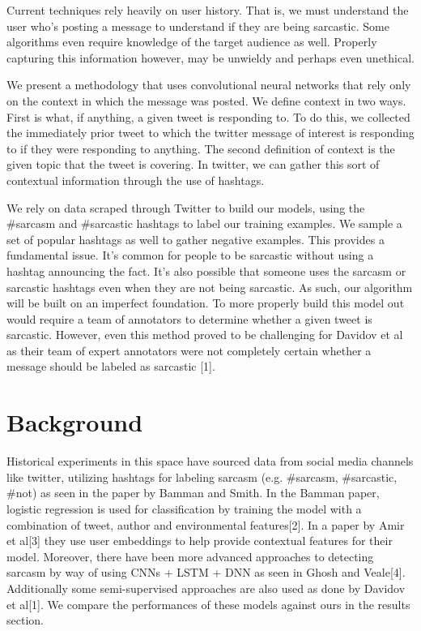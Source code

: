 \documentclass[11pt,a4paper]{article}
\begin{document}
Current techniques rely heavily on user history. That is, we must understand the user who's posting a message to understand if they are
being sarcastic. Some algorithms even require knowledge of the target audience as well. Properly capturing this information however, may be unwieldy and perhaps even unethical. 

We present a methodology that uses convolutional neural networks that rely only on the context in which the message was posted. We define context in two ways. First is what, if anything, a given tweet is responding to. To do this, we collected the immediately prior tweet to which the twitter message of interest is responding to if they were responding to anything. The second definition of context is the given topic that the tweet is covering. In twitter, we can gather this sort of contextual information through the use of hashtags.

We rely on data scraped through Twitter to build our models, using the \#sarcasm and \#sarcastic hashtags to label our training examples. We sample a set of popular hashtags as well to gather negative examples. This provides a fundamental issue. It's common for people to be sarcastic without using a hashtag announcing the fact. It's also possible that someone uses the sarcasm or sarcastic hashtags even when they are not being sarcastic. As such, our algorithm will  be built on an imperfect foundation. To more properly build this model out would require a team of annotators to determine whether a given tweet is sarcastic. However, even this method proved to be challenging for Davidov et al as their team of expert annotators were not completely certain whether a message should be labeled as sarcastic [1].

\section{Background}

Historical experiments in this space have sourced data from social media channels like twitter, utilizing hashtags for labeling sarcasm (e.g. \#sarcasm, \#sarcastic, \#not) as seen in the paper by Bamman and Smith. In the Bamman paper, logistic regression is used for classification by training the model with a combination of tweet, author and environmental features[2].  In a paper by Amir et al[3] they use user embeddings to help provide contextual features for their model.  Moreover, there have been more advanced approaches to detecting sarcasm by way of using CNNs + LSTM + DNN as seen in Ghosh and Veale[4].  Additionally some semi-supervised approaches are also used as done by Davidov et al[1]. We compare the performances of these models against ours in the results section.
\end{document}
